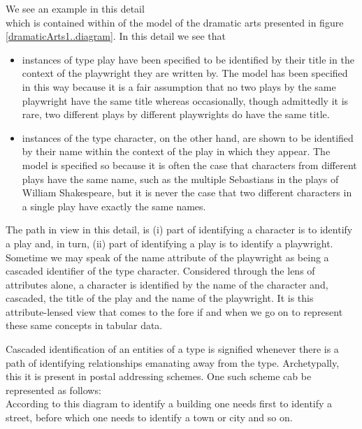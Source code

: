 \mynote
We see an example in this detail
\begin{equation*}

\end{equation*}
which is contained within of the model of the dramatic arts presented in figure \ref{dramaticArts1..diagram}. 
In this detail we see that
\begin{itemize}
\item
instances of  type play have been specified to be identified by their title 
in the context of the playwright  they are written by.
The model has been specified in this way 
because it is a fair assumption that no two plays by the same playwright have the same title
whereas occasionally, though admittedly it is rare, 
two different plays by different playwrights do have the same title.  
\item instances of the type character, on the other hand,  are shown to be identified by their name within the context of the play in which they appear. 
The model is specified so because it is often the case that characters from different plays have the same name, such as the multiple Sebastians in the plays of William Shakespeare, but it is never the case that two different characters in a single play have exactly the same names.
\end{itemize}

The path in view in this detail, is 
(i)  part of identifying a character is to identify a play and, in turn,
(ii) part of identifying a play is to identify a playwright. 
Sometime we may speak of the name attribute of the playwright as being a cascaded identifier of the type character. Considered through the lens of attributes alone, a character is identified by the name of the character and, 
cascaded, the title of the play and the name of the playwright.
It is this attribute-lensed view that comes to the fore if and when we go on to represent these same concepts in tabular data.  

Cascaded identification of an entities of a type is signified whenever there is a path of identifying relationships emanating away from the type. 
Archetypally, this it is present in postal addressing schemes. One such scheme cab be represented as follows:
\begin{equation*}

\end{equation*}
According to this diagram to identify a building one needs first to identify a street, before which one needs to identify a town or city and so on.


